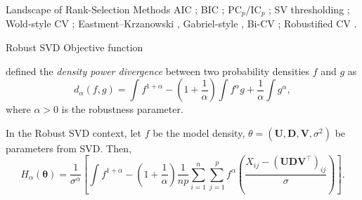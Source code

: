 \documentclass{beamer}
\newcommand{\tr}{^\top}
\newcommand{\bb}[1]{\boldsymbol{#1}}
\begin{document}
\begin{frame}{Landscape of Rank-Selection Methods}
    \vspace*{0.3em}
    \tiny
    \noindent AIC \cite{akaike1973information}; BIC \cite{schwarz1978estimating}; PC$_p$/IC$_p$ \cite{bai2002determining}; SV thresholding \cite{shabalin2013reconstruction, gavish2014optimal, choi2017selecting, xu2021adaptive}; Wold-style CV \cite{wold1978crossvalidation}; Eastment--Krzanowski \cite{eastment1982crossvalidation}, Gabriel-style \cite{gabriel2002lebiplot}, Bi-CV \cite{owen2009bi}; Robustified CV \cite{alarcon2022cv}.
\end{frame}




\begin{frame}{Robust SVD Objective function}
    \small
    \begin{definition}
        \cite{basu1998dpd} defined the \emph{density power divergence} between two probability densities $f$ and $g$ as 
        \begin{equation*}
            d_\alpha(f, g) = \int f^{1+\alpha} - \left(1 + \frac{1}{\alpha} \right)\int f^\alpha g + \frac{1}{\alpha}\int g^\alpha,
        \end{equation*}        
        \noindent where $\alpha > 0$ is the robustness parameter.
    \end{definition}
    \pause

    \noindent In the Robust SVD context, let $f$ be the model density, $\theta = (\bb{U}, \bb{D}, \bb{V}, \sigma^2)$ be parameters from SVD. Then,
    \begin{equation*}
        H_\alpha(\bb{\theta}) = \frac{1}{\sigma^\alpha} \left[ \int f^{1+\alpha} - \left( 1 + \frac{1}{\alpha} \right) \frac{1}{np}\sum_{i=1}^n\sum_{j=1}^p f^\alpha\left( \frac{X_{ij} - (\bb{UDV}\tr)_{ij}}{\sigma} \right)\right].
    \end{equation*} 
\end{frame}
\end{document}

